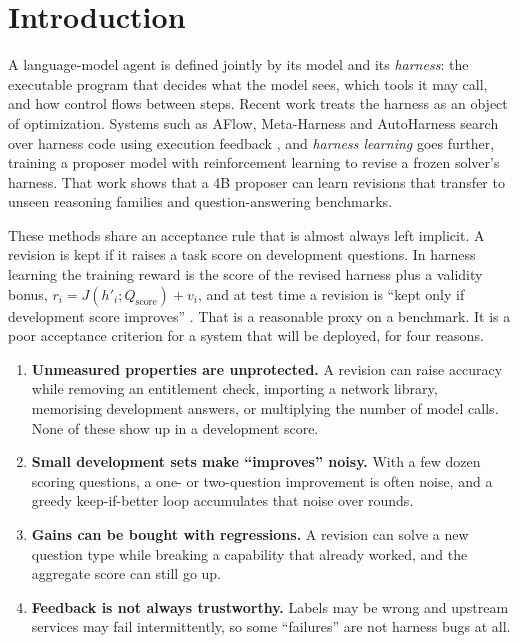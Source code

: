 \section{Introduction}
\label{sec:intro}

A language-model agent is defined jointly by its model and its \emph{harness}: the executable program
that decides what the model sees, which tools it may call, and how control flows between steps.
Recent work treats the harness as an object of optimization. Systems such as AFlow, Meta-Harness and
AutoHarness search over harness code using execution feedback
\citep{zhang2025aflow,lee2026metaharness,lou2026autoharness}, and \emph{harness learning}
\citep{zhang2026harnesslearning} goes further, training a proposer model with reinforcement learning to
revise a frozen solver's harness. That work shows that a 4B proposer can learn revisions that transfer
to unseen reasoning families and question-answering benchmarks.

These methods share an acceptance rule that is almost always left implicit. A revision is kept if it raises a
task score on development questions. In harness learning the training reward is the score of the revised
harness plus a validity bonus, $r_i = J(h'_i; Q_{\text{score}}) + v_i$, and at test time a revision is
``kept only if development score improves'' \citep{zhang2026harnesslearning}. That is a reasonable
proxy on a benchmark. It is a poor acceptance criterion for a system that will be deployed, for four
reasons.
\begin{enumerate}[leftmargin=*,itemsep=1pt]
  \item \textbf{Unmeasured properties are unprotected.} A revision can raise accuracy while removing an
  entitlement check, importing a network library, memorising development answers, or multiplying the
  number of model calls. None of these show up in a development score.
  \item \textbf{Small development sets make ``improves'' noisy.} With a few dozen scoring questions, a
  one- or two-question improvement is often noise, and a greedy keep-if-better loop accumulates that noise
  over rounds.
  \item \textbf{Gains can be bought with regressions.} A revision can solve a new question type while
  breaking a capability that already worked, and the aggregate score can still go up.
  \item \textbf{Feedback is not always trustworthy.} Labels may be wrong and upstream services may fail
  intermittently, so some ``failures'' are not harness bugs at all.
\end{enumerate}

